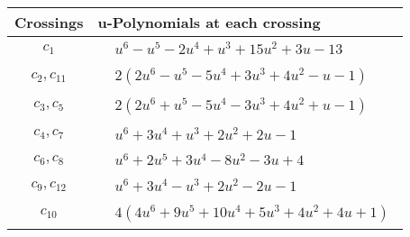 \documentclass[1p]{elsarticle_modified}
\theoremstyle{definition}
\begin{document}
\begin{tabular}{m{50pt}|m{274pt}}
Crossings & \hspace{64pt}u-Polynomials at each crossing \\
\hline $$\begin{aligned}c_{1}\end{aligned}$$&$\begin{aligned}
&u^6- u^5-2 u^4+u^3+15 u^2+3 u-13
\end{aligned}$\\
\hline $$\begin{aligned}c_{2},c_{11}\end{aligned}$$&$\begin{aligned}
&2(2 u^6- u^5-5 u^4+3 u^3+4 u^2- u-1)
\end{aligned}$\\
\hline $$\begin{aligned}c_{3},c_{5}\end{aligned}$$&$\begin{aligned}
&2(2 u^6+u^5-5 u^4-3 u^3+4 u^2+u-1)
\end{aligned}$\\
\hline $$\begin{aligned}c_{4},c_{7}\end{aligned}$$&$\begin{aligned}
&u^6+3 u^4+u^3+2 u^2+2 u-1
\end{aligned}$\\
\hline $$\begin{aligned}c_{6},c_{8}\end{aligned}$$&$\begin{aligned}
&u^6+2 u^5+3 u^4-8 u^2-3 u+4
\end{aligned}$\\
\hline $$\begin{aligned}c_{9},c_{12}\end{aligned}$$&$\begin{aligned}
&u^6+3 u^4- u^3+2 u^2-2 u-1
\end{aligned}$\\
\hline $$\begin{aligned}c_{10}\end{aligned}$$&$\begin{aligned}
&4(4 u^6+9 u^5+10 u^4+5 u^3+4 u^2+4 u+1)
\end{aligned}$\\
\hline
\end{tabular}\\~\\
\newpage\renewcommand{\arraystretch}{1}
\end{document}
